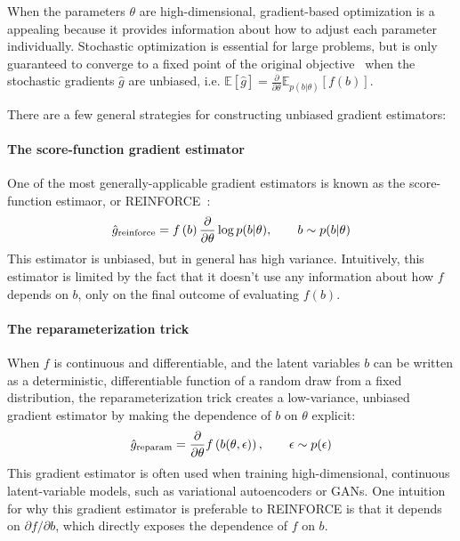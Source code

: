 \documentclass{article}
\newcommand{\PT}{\frac{\partial}{\partial \theta}}
\begin{document}
When the parameters $\theta$ are high-dimensional, gradient-based optimization is a appealing because it provides information about how to adjust each parameter individually.
Stochastic optimization is essential for large problems, but is only guaranteed to converge to a fixed point of the original objective~\citep{robbins1951stochastic} when the stochastic gradients $\hat g$ are unbiased, i.e. ${\mathbb{E} \left[ \hat g \right] = \PT \mathbb{E}_{p(b|\theta)} \left[ f(b) \right]}$.

There are a few general strategies for constructing unbiased gradient estimators:

\paragraph{The score-function gradient estimator}
One of the most generally-applicable gradient estimators is known as the score-function estimaor, or REINFORCE~\citep{williams1992simple}:
%
\begin{align}
\hat g_\textnormal{reinforce} =  f \left( b \right) \PT \log p(b | \theta), \qquad b \sim p(b | \theta)
\end{align}
%
This estimator is unbiased, but in general has high variance.
Intuitively, this estimator is limited by the fact that it doesn't use any information about how $f$ depends on $b$, only on the final outcome of evaluating $f(b)$.

\paragraph{The reparameterization trick}
When $f$ is continuous and differentiable, and the latent variables $b$ can be written as a deterministic, differentiable function of a random draw from a fixed distribution, the reparameterization trick \citep{williams1992simple, kingma2013autoencoding, rezende2014stochastic} creates a low-variance, unbiased gradient estimator by making the dependence of $b$ on $\theta$ explicit:
%
\begin{align}
\hat g_\textnormal{reparam} = \PT f \left( b(\theta, \epsilon) \right), \qquad \epsilon \sim p(\epsilon)
\end{align}
%
This gradient estimator is often used when training high-dimensional, continuous latent-variable models, such as variational autoencoders or GANs.
One intuition for why this gradient estimator is preferable to REINFORCE is that it depends on $\partial f / \partial b$, which directly exposes the dependence of $f$ on $b$.
\end{document}
